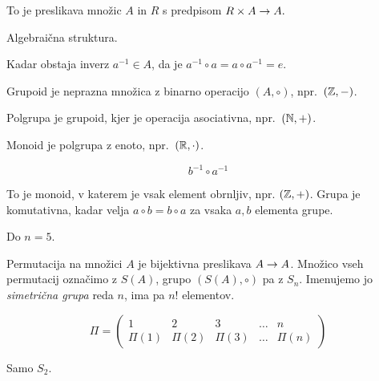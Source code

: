 To je preslikava množic $A$ in $R$ s predpisom $R\times A \to A.$


Algebraična struktura.


Kadar obstaja inverz $a^{-1} \in A$, da je $a^{-1} \circ a = a \circ a^{-1} = e$.


Grupoid je neprazna množica z binarno operacijo $(A, \circ)$, npr.~$(\mathbb{Z}, -)$.

Polgrupa je grupoid, kjer je operacija asociativna, npr.~$(\mathbb{N}, +)$.

Monoid je polgrupa z enoto, npr.~$(\mathbb{R}, \cdot)$.


\[
	b^{-1} \circ a^{-1}
\]


To je monoid, v katerem je vsak element obrnljiv, npr. $(\mathbb{Z}, +)$. Grupa je komutativna, kadar velja $a \circ b = b \circ a$ za vsaka $a, b$ elementa grupe.


Do $n=5$.


Permutacija na množici $A$ je bijektivna preslikava $A \to A$. Množico vseh permutacij označimo z $S(A)$, grupo $(S(A), \circ)$ pa z $S_n$. Imenujemo jo \textit{simetrična grupa} reda $n$, ima pa $n!$ elementov.


\[
	\Pi = \begin{pmatrix}
		1 & 2 & 3 & \ldots & n \\
		\Pi(1) & \Pi(2) & \Pi(3) & \ldots & \Pi(n)
	\end{pmatrix}
\]


Samo $S_2$.


